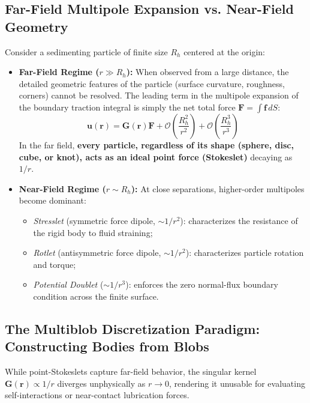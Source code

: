 \documentclass[11pt,a4paper]{article}
\begin{document}
\subsection{Far-Field Multipole Expansion vs. Near-Field Geometry}
Consider a sedimenting particle of finite size $R_h$ centered at the origin:
\begin{itemize}
    \item \textbf{Far-Field Regime ($r \gg R_h$):} When observed from a large distance, the detailed geometric features of the particle (surface curvature, roughness, corners) cannot be resolved. The leading term in the multipole expansion of the boundary traction integral is simply the net total force $\mathbf{F} = \int \mathbf{f} \, dS$:
    \begin{equation}
        \mathbf{u}(\mathbf{r}) = \mathbf{G}(\mathbf{r}) \mathbf{F} + \mathcal{O}\left(\frac{R_h^2}{r^2}\right) + \mathcal{O}\left(\frac{R_h^3}{r^3}\right)
    \end{equation}
    In the far field, \textbf{every particle, regardless of its shape (sphere, disc, cube, or knot), acts as an ideal point force (Stokeslet)} decaying as $1/r$.
    \item \textbf{Near-Field Regime ($r \sim R_h$):} At close separations, higher-order multipoles become dominant:
    \begin{itemize}
        \item \emph{Stresslet} (symmetric force dipole, $\sim 1/r^2$): characterizes the resistance of the rigid body to fluid straining;
        \item \emph{Rotlet} (antisymmetric force dipole, $\sim 1/r^2$): characterizes particle rotation and torque;
        \item \emph{Potential Doublet} ($\sim 1/r^3$): enforces the zero normal-flux boundary condition across the finite surface.
    \end{itemize}
\end{itemize}

\subsection{The Multiblob Discretization Paradigm: Constructing Bodies from Blobs}
While point-Stokeslets capture far-field behavior, the singular kernel $\mathbf{G}(\mathbf{r}) \propto 1/r$ diverges unphysically as $r \to 0$, rendering it unusable for evaluating self-interactions or near-contact lubrication forces.
\end{document}
